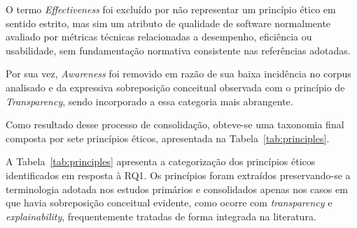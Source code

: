O termo \textit{Effectiveness} foi excluído por não representar um princípio ético em sentido estrito, mas sim um atributo de qualidade de software normalmente avaliado por métricas técnicas relacionadas a desempenho, eficiência ou usabilidade, sem fundamentação normativa consistente nas referências adotadas.

Por sua vez, \textit{Awareness} foi removido em razão de sua baixa incidência no corpus analisado e da expressiva sobreposição conceitual observada com o princípio de \textit{Transparency}, sendo incorporado a essa categoria mais abrangente.

Como resultado desse processo de consolidação, obteve-se uma taxonomia final composta por sete princípios éticos, apresentada na Tabela~\ref{tab:principles}.

A Tabela~\ref{tab:principles} apresenta a categorização dos princípios éticos identificados em resposta à RQ1. Os princípios foram extraídos preservando-se a terminologia adotada nos estudos primários e consolidados apenas nos casos em que havia sobreposição conceitual evidente, como ocorre com \textit{transparency} e \textit{explainability}, frequentemente tratadas de forma integrada na literatura.

